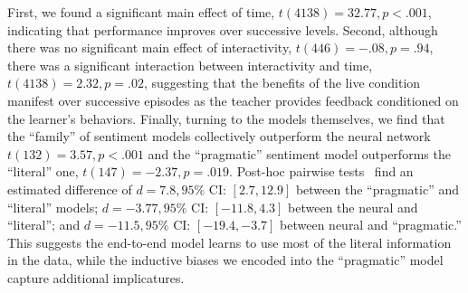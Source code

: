 \documentclass[letterpaper]{article} %
\begin{document}
First, we found a significant main effect of time, $t(4138)=32.77, p<.001$, indicating that performance improves over successive levels.
Second, although there was no significant main effect of interactivity, $t(446)=-.08, p=.94$, there was a significant interaction between  interactivity and time, $t(4138)=2.32, p=.02$, suggesting that the benefits of the live condition manifest over successive episodes as the teacher provides feedback conditioned on the learner's behaviors.
Finally, turning to the models themselves, we find that the ``family'' of sentiment models collectively outperform the neural network $t(132)=3.57, p<.001$ and the ``pragmatic'' sentiment model outperforms the ``literal'' one, $t(147)=-2.37, p=.019$.
Post-hoc pairwise tests~\cite{tukey1953section} find an estimated difference of $d = 7.8, 95\%$ CI: $[2.7, 12.9]$ between the ``pragmatic'' and ``literal'' models; $d = -3.77, 95\%$ CI: $[-11.8, 4.3]$ between the neural and ``literal''; and $d = -11.5, 95\%$ CI: $[-19.4, -3.7]$ between neural and ``pragmatic.''
This suggests the end-to-end model learns to use most of the literal information in the data, while the inductive biases we encoded into the ``pragmatic'' model capture additional implicatures.
\vspace{-3.20mm}
\end{document}
